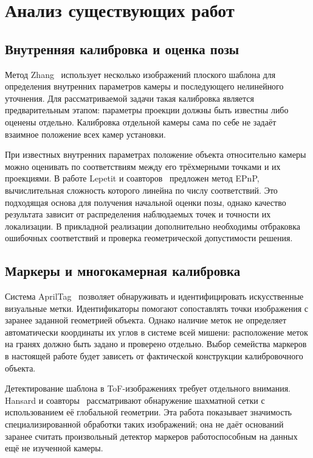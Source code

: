 \section{Анализ существующих работ}

\subsection{Внутренняя калибровка и оценка позы}

Метод Zhang~\cite{zhang2000} использует несколько изображений плоского шаблона для определения внутренних параметров камеры и последующего нелинейного уточнения. Для рассматриваемой задачи такая калибровка является предварительным этапом: параметры проекции должны быть известны либо оценены отдельно. Калибровка отдельной камеры сама по себе не задаёт взаимное положение всех камер установки.

При известных внутренних параметрах положение объекта относительно камеры можно оценивать по соответствиям между его трёхмерными точками и их проекциями. В работе Lepetit и соавторов~\cite{lepetit2009} предложен метод EPnP, вычислительная сложность которого линейна по числу соответствий. Это подходящая основа для получения начальной оценки позы, однако качество результата зависит от распределения наблюдаемых точек и точности их локализации. В прикладной реализации дополнительно необходимы отбраковка ошибочных соответствий и проверка геометрической допустимости решения.

\subsection{Маркеры и многокамерная калибровка}

Система AprilTag~\cite{olson2011} позволяет обнаруживать и идентифицировать искусственные визуальные метки. Идентификаторы помогают сопоставлять точки изображения с заранее заданной геометрией объекта. Однако наличие меток не определяет автоматически координаты их углов в системе всей мишени: расположение меток на гранях должно быть задано и проверено отдельно. Выбор семейства маркеров в настоящей работе будет зависеть от фактической конструкции калибровочного объекта.

Детектирование шаблона в ToF-изображениях требует отдельного внимания. Hansard и соавторы~\cite{hansard2014} рассматривают обнаружение шахматной сетки с использованием её глобальной геометрии. Эта работа показывает значимость специализированной обработки таких изображений; она не даёт оснований заранее считать произвольный детектор маркеров работоспособным на данных ещё не изученной камеры.


